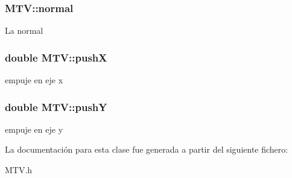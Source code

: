\subsubsection[{normal}]{ M\+T\+V\+::normal}\label{classMTV_a58d902ffde67432fbee0c742f016b2ba}
La normal \hypertarget{classMTV_acfb5b0a55e4b63ad18fd205f900e4d60}{}
\subsubsection[{push\+X}]{\setlength{\rightskip}{0pt plus 5cm}double M\+T\+V\+::push\+X}\label{classMTV_acfb5b0a55e4b63ad18fd205f900e4d60}
empuje en eje x \hypertarget{classMTV_a4e5cd146259cf601cdcf2e0882014f48}{}
\subsubsection[{push\+Y}]{\setlength{\rightskip}{0pt plus 5cm}double M\+T\+V\+::push\+Y}\label{classMTV_a4e5cd146259cf601cdcf2e0882014f48}
empuje en eje y 

La documentación para esta clase fue generada a partir del siguiente fichero\+:\begin{DoxyCompactItemize}
\item 
M\+T\+V.\+h\end{DoxyCompactItemize}
